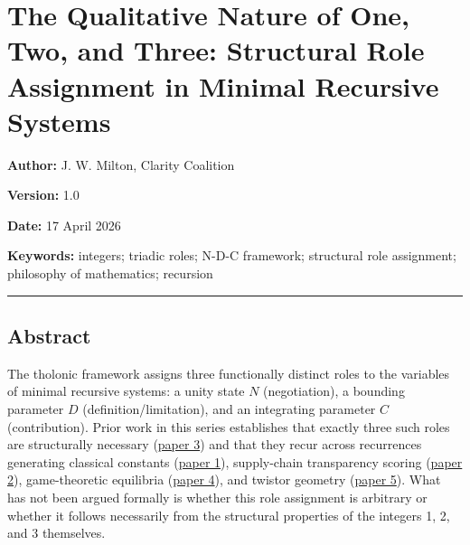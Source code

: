 \documentclass[
  11pt,
  letterpaper,
]{article}
\author{}
\date{}
\begin{document}
\section{The Qualitative Nature of One, Two, and Three: Structural Role
Assignment in Minimal Recursive
Systems}\label{the-qualitative-nature-of-one-two-and-three-structural-role-assignment-in-minimal-recursive-systems}

\textbf{Author:} J. W. Milton, Clarity Coalition

\textbf{Version:} 1.0

\textbf{Date:} 17 April 2026

\textbf{Keywords:} integers; triadic roles; N-D-C framework; structural
role assignment; philosophy of mathematics; recursion

\begin{center}\rule{0.5\linewidth}{0.5pt}\end{center}

\subsection{Abstract}\label{abstract}

The tholonic framework assigns three functionally distinct roles to the
variables of minimal recursive systems: a unity state \(N\)
(negotiation), a bounding parameter \(D\) (definition/limitation), and
an integrating parameter \(C\) (contribution). Prior work in this series
establishes that exactly three such roles are structurally necessary
(\href{https://github.com/baardev/truevalue/blob/main/docnav/Research/papers/3_minimal-recursive-triadic-framework/3_minimal-recursive-triadic-framework.pdf}{paper
3}) and that they recur across recurrences generating classical
constants
(\href{https://github.com/baardev/truevalue/blob/main/docnav/Research/papers/1_recursive-tholonic-five-constants/1_recursive-tholonic-five-constants.pdf}{paper
1}), supply-chain transparency scoring
(\href{https://github.com/baardev/truevalue/blob/main/docnav/Research/papers/2_supply-chain-transparency-tvpci/2_supply-chain-transparency-tvpci.pdf}{paper
2}), game-theoretic equilibria
(\href{https://github.com/baardev/truevalue/blob/main/docnav/Research/papers/4_game-theoretic-triadic-balance/4_game-theoretic-triadic-balance.pdf}{paper
4}), and twistor geometry
(\href{https://github.com/baardev/truevalue/blob/main/docnav/Research/papers/5_tholonic-twistor-connection/5_tholonic-twistor-connection.pdf}{paper
5}). What has not been argued formally is whether this role assignment
is arbitrary or whether it follows necessarily from the structural
properties of the integers 1, 2, and 3 themselves.
\end{document}
